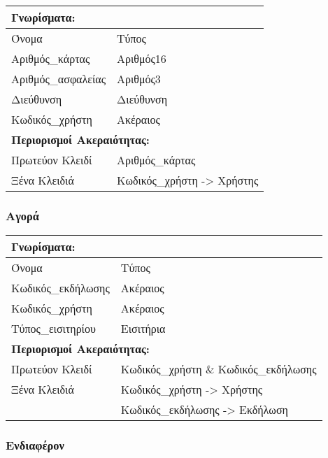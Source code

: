 \begin{tabular}{|p{6cm}|p{8cm}|}
  \multicolumn{2}{l}{\textbf{Γνωρίσματα:}}               \\ \hline
  Όνομα              & Τύπος                             \\ \hline
  Αριθμός\_κάρτας    & Αριθμός16                         \\ \hline
  Αριθμός\_ασφαλείας & Αριθμός3                          \\ \hline
  Διεύθυνση          & Διεύθυνση                         \\ \hline
  Κωδικός\_χρήστη    & Ακέραιος                          \\ \hline
  \multicolumn{2}{l}{\textbf{Περιορισμοί Ακεραιότητας:}} \\ \hline
  Πρωτεύον Κλειδί    & Αριθμός\_κάρτας                   \\ \hline
  Ξένα Κλειδιά       & Κωδικός\_χρήστη -> Χρήστης        \\ \hline
\end{tabular}

\subsubsection{Αγορά}

\begin{tabular}{|p{6cm}|p{8cm}|}
  \multicolumn{2}{l}{\textbf{Γνωρίσματα:}}                   \\ \hline
  Όνομα              & Τύπος                                 \\ \hline
  Κωδικός\_εκδήλωσης & Ακέραιος                              \\ \hline
  Κωδικός\_χρήστη    & Ακέραιος                              \\ \hline
  Τύπος\_εισιτηρίου  & Εισιτήρια                             \\ \hline
  \multicolumn{2}{l}{\textbf{Περιορισμοί Ακεραιότητας:}}     \\ \hline
  Πρωτεύον Κλειδί    & Κωδικός\_χρήστη \& Κωδικός\_εκδήλωσης \\ \hline
  Ξένα Κλειδιά       & Κωδικός\_χρήστη -> Χρήστης            \\ \hline
                     & Κωδικός\_εκδήλωσης -> Εκδήλωση        \\ \hline
\end{tabular}

\subsubsection{Ενδιαφέρον}

